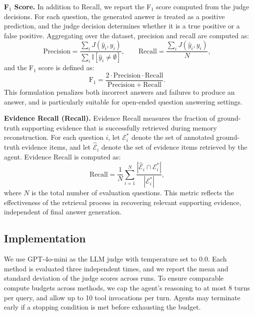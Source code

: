 \textbf{F$_1$ Score.}
In addition to Recall, we report the F$_1$ score computed from the judge decisions.
For each question, the generated answer is treated as a positive prediction, and the judge decision determines whether it is a true positive or a false positive.
Aggregating over the dataset, precision and recall are computed as:
\begin{equation}
\mathrm{Precision}
=
\frac{\sum_i J(\hat{y}_i, y_i)}{\sum_i \mathbb{I}[\hat{y}_i \neq \emptyset]},
\qquad
\mathrm{Recall}
=
\frac{\sum_i J(\hat{y}_i, y_i)}{N},
\end{equation}
and the F$_1$ score is defined as:
\begin{equation}
\mathrm{F}_1
=
\frac{2 \cdot \mathrm{Precision} \cdot \mathrm{Recall}}
{\mathrm{Precision} + \mathrm{Recall}}.
\end{equation}
This formulation penalizes both incorrect answers and failures to produce an answer, and is particularly suitable for open-ended question answering settings.


\textbf{Evidence Recall (Recall).}
Evidence Recall measures the fraction of ground-truth supporting evidence that is successfully retrieved during memory reconstruction.
For each question $i$, let $\mathcal{E}_i^{\ast}$ denote the set of annotated ground-truth evidence items, and let $\hat{\mathcal{E}}_i$ denote the set of evidence items retrieved by the agent.
Evidence Recall is computed as:
\begin{equation}
\mathrm{Recall}
=
\frac{1}{N}
\sum_{i=1}^{N}
\frac{|\hat{\mathcal{E}}_i \cap \mathcal{E}_i^{\ast}|}
{|\mathcal{E}_i^{\ast}|},
\end{equation}
where $N$ is the total number of evaluation questions.
This metric reflects the effectiveness of the retrieval process in recovering relevant supporting evidence, independent of final answer generation.


\subsection{Implementation}
We use GPT-4o-mini as the LLM judge with temperature set to 0.0. Each method is evaluated three independent times, and we report the mean and standard deviation of the judge scores across runs.
To ensure comparable compute budgets across methods, we cap the agent’s reasoning to at most 8 turns per query, and allow up to 10 tool invocations per turn. Agents may terminate early if a stopping condition is met before exhausting the budget.


